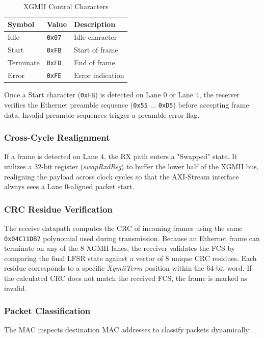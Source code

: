 \begin{table}[H]
\centering
\begin{tabular}{|l|l|l|}
\hline
\textbf{Symbol} & \textbf{Value} & \textbf{Description} \\ \hline \hline
Idle & \texttt{0x07} & Idle character \\ \hline
Start & \texttt{0xFB} & Start of frame \\ \hline
Terminate & \texttt{0xFD} & End of frame \\ \hline
Error & \texttt{0xFE} & Error indication \\ \hline
\end{tabular}
\caption{XGMII Control Characters}\label{table:xgmii_ctrl}
\end{table}

Once a Start character (\texttt{0xFB}) is detected on Lane 0 or Lane 4, the receiver verifies the Ethernet preamble sequence (\texttt{0x55} ... \texttt{0xD5}) before accepting frame data. Invalid preamble sequences trigger a preamble error flag.

\subsubsection{Cross-Cycle Realignment}
If a frame is detected on Lane 4, the RX path enters a "Swapped" state. It utilizes a 32-bit register (\textit{swapRxdReg}) to buffer the lower half of the XGMII bus, realigning the payload across clock cycles so that the AXI-Stream interface always sees a Lane 0-aligned packet start.

\subsubsection{CRC Residue Verification}
The receive datapath computes the CRC of incoming frames using the same \texttt{0x04C11DB7} polynomial used during transmission. Because an Ethernet frame can terminate on any of the 8 XGMII lanes, the receiver validates the FCS by comparing the final LFSR state against a vector of 8 unique CRC residues. Each residue corresponds to a specific \textit{XgmiiTerm} position within the 64-bit word. If the calculated CRC does not match the received FCS, the frame is marked as invalid.

\subsubsection{Packet Classification}
The MAC inspects destination MAC addresses to classify packets dynamically:

